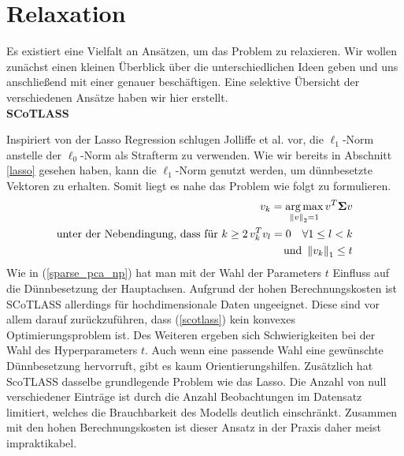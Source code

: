 

\section{Relaxation}
\label{relaxation}

Es existiert eine Vielfalt an Ansätzen, um das Problem zu relaxieren. Wir wollen zunächst einen kleinen Überblick über die unterschiedlichen Ideen geben und uns anschließend mit einer genauer beschäftigen. Eine selektive Übersicht der verschiedenen Ansätze haben wir hier erstellt.\\

\textbf{SCoTLASS}

Inspiriert von der Lasso Regression \cite{tibshirani_lasso} schlugen Jolliffe et al. \cite{scotlass} vor, die $\ell_1$-Norm anstelle der $\ell_0$-Norm als Strafterm zu verwenden. Wie wir bereits in Abschnitt \ref{lasso} gesehen haben, kann die $\ell_1$-Norm genutzt werden, um dünnbesetzte Vektoren zu erhalten. Somit liegt es nahe das Problem wie folgt zu formulieren.
\begin{gather}
\label{scotlass}
\begin{split}
v_{k} = \operatorname*{arg\,max}_{\left\lVert v \right\rVert_2 = 1} v^{T}\mathbf{\Sigma} v\\
\text{unter der Nebendingung, dass für } k\geq 2 \, v_{k}^Tv_{l} = 0 \quad \forall 1 \leq l < k\\
\text{und } \left\lVert v_{k} \right\rVert_1 \leq t 
\end{split}
\end{gather}
Wie in (\ref{sparse_pca_np}) hat man mit der Wahl der Parameters $t$ Einfluss auf die Dünnbesetzung der Hauptachsen. Aufgrund der hohen Berechnungskosten ist SCoTLASS allerdings für hochdimensionale Daten ungeeignet. Diese sind vor allem darauf zurückzuführen, dass (\ref{scotlass}) kein konvexes Optimierungsproblem ist. Des Weiteren ergeben sich Schwierigkeiten bei der Wahl des Hyperparameters $t$. Auch wenn eine passende Wahl eine gewünschte Dünnbesetzung hervorruft, gibt es kaum Orientierungshilfen. Zusätzlich hat ScoTLASS dasselbe grundlegende Problem wie das Lasso. Die Anzahl von null verschiedener Einträge ist durch die Anzahl Beobachtungen im Datensatz limitiert, welches die Brauchbarkeit des Modells deutlich einschränkt. Zusammen mit den hohen Berechnungskosten ist dieser Ansatz in der Praxis daher meist impraktikabel.\\

